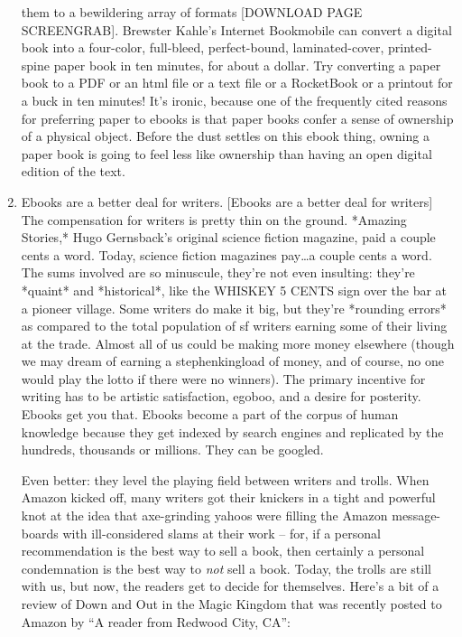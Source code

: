 \begin{enumerate}
  them to a bewildering array of formats [DOWNLOAD PAGE SCREENGRAB].
  Brewster Kahle's Internet Bookmobile can convert a digital book
  into a four-color, full-bleed, perfect-bound, laminated-cover,
  printed-spine paper book in ten minutes, for about a dollar. Try
  converting a paper book to a PDF or an html file or a text file or
  a RocketBook or a printout for a buck in ten minutes! It's ironic,
  because one of the frequently cited reasons for preferring paper to
  ebooks is that paper books confer a sense of ownership of a
  physical object. Before the dust settles on this ebook thing,
  owning a paper book is going to feel less like ownership than
  having an open digital edition of the text.
\item
  Ebooks are a better deal for writers. [Ebooks are a better deal for
  writers] The compensation for writers is pretty thin on the ground.
  *Amazing Stories,* Hugo Gernsback's original science fiction
  magazine, paid a couple cents a word. Today, science fiction
  magazines pay\ldots{}a couple cents a word. The sums involved are so
  minuscule, they're not even insulting: they're *quaint* and
  *historical*, like the WHISKEY 5 CENTS sign over the bar at a
  pioneer village. Some writers do make it big, but they're *rounding
  errors* as compared to the total population of sf writers earning
  some of their living at the trade. Almost all of us could be making
  more money elsewhere (though we may dream of earning a
  stephenkingload of money, and of course, no one would play the
  lotto if there were no winners). The primary incentive for writing
  has to be artistic satisfaction, egoboo, and a desire for
  posterity. Ebooks get you that. Ebooks become a part of the corpus
  of human knowledge because they get indexed by search engines and
  replicated by the hundreds, thousands or millions. They can be
  googled.
  
  Even better: they level the playing field between writers and
  trolls. When Amazon kicked off, many writers got their knickers in
  a tight and powerful knot at the idea that axe-grinding yahoos were
  filling the Amazon message-boards with ill-considered slams at
  their work -- for, if a personal recommendation is the best way to
  sell a book, then certainly a personal condemnation is the best way
  to \emph{not} sell a book. Today, the trolls are still with us,
  but now, the readers get to decide for themselves. Here's a bit of
  a review of Down and Out in the Magic Kingdom that was recently
  posted to Amazon by ``A reader from Redwood City, CA'':
  

\end{enumerate}
